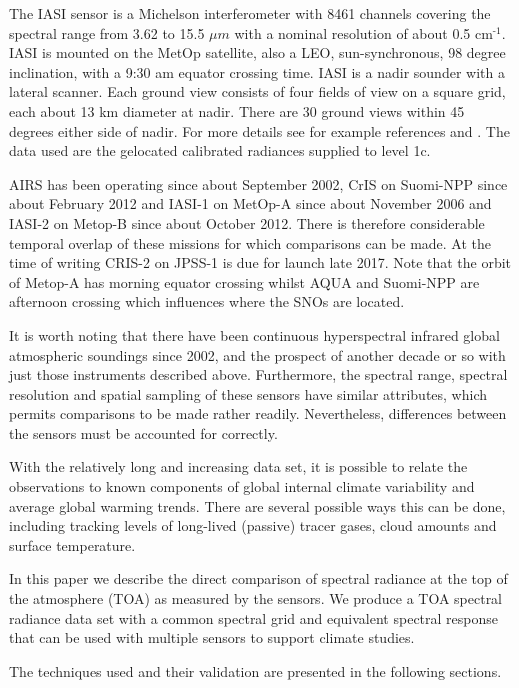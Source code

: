 \documentclass[twocolumn,10pt]{article}
\begin{document}
The IASI sensor is a Michelson interferometer with 8461 channels covering the spectral range from 3.62 to 15.5 \(\mu m\) with a nominal resolution of about 0.5 cm\(^{\text{-1}}\). IASI is mounted on the MetOp satellite, also a LEO, sun-synchronous, 98 degree inclination, with a 9:30 am equator crossing time. IASI is a nadir sounder with a lateral scanner. Each ground view consists of four fields of view on a square grid, each about 13 km diameter at nadir. There are 30 ground views within 45 degrees either side of nadir. For more details see for example references \cite{iasiweb} and \cite{iasiover}. The data used are the gelocated calibrated radiances supplied to level 1c.

AIRS has been operating since about September 2002, CrIS on Suomi-NPP since about February 2012 and IASI-1 on MetOp-A since about November 2006 and IASI-2 on Metop-B since about October 2012. There is therefore considerable temporal overlap of these missions for which comparisons can be made. At the time of writing CRIS-2 on JPSS-1 is due for launch late 2017. Note that the orbit of Metop-A has morning equator crossing whilst AQUA and Suomi-NPP are afternoon crossing which influences where the SNOs are located.

It is worth noting that there have been continuous hyperspectral infrared global atmospheric soundings since 2002, and the prospect of another decade or so with just those instruments described above. Furthermore, the spectral range, spectral resolution and spatial sampling of these sensors have similar attributes, which permits comparisons to be made rather readily. Nevertheless, differences between the sensors must be accounted for correctly.

With the relatively long and increasing data set, it is possible to relate the  observations to known components of global internal climate variability and average global warming trends. There are several possible ways this can be done, including tracking levels of long-lived (passive) tracer gases, cloud amounts and surface temperature. 

In this paper we describe the direct comparison of spectral radiance at the top of the atmosphere (TOA) as measured by the sensors. We produce a TOA spectral radiance data set with a common spectral grid and equivalent spectral response that can be used with multiple sensors to support climate studies.

The techniques used and their validation are presented in the following sections.  
\end{document}
